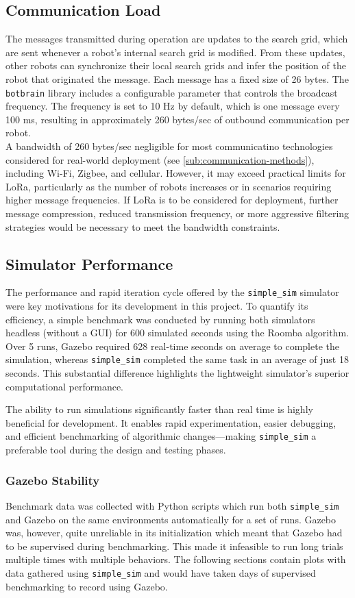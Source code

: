 \subsection{Communication Load}
The messages transmitted during operation are updates to the search grid, which are sent whenever a robot’s internal search grid is modified. From these updates, other robots can synchronize their local search grids and infer the position of the robot that originated the message. Each message has a fixed size of 26 bytes. The \texttt{botbrain} library includes a configurable parameter that controls the broadcast frequency. The frequency is set to 10 Hz by default, which is one message every 100 ms, resulting in approximately 260 bytes/sec of outbound communication per robot. \\

A bandwidth of 260 bytes/sec negligible for most communicatino technologies considered for real-world deployment (see \cref{sub:communication-methods}), including Wi-Fi, Zigbee, and cellular. However, it may exceed practical limits for LoRa, particularly as the number of robots increases or in scenarios requiring higher message frequencies. If LoRa is to be considered for deployment, further message compression, reduced transmission frequency, or more aggressive filtering strategies would be necessary to meet the bandwidth constraints.

\subsection{Simulator Performance}
\label{sec:simulator-performance}
The performance and rapid iteration cycle offered by the \texttt{simple\_sim} simulator were key motivations for its development in this project. To quantify its efficiency, a simple benchmark was conducted by running both simulators headless (without a GUI) for 600 simulated seconds using the Roomba algorithm. Over 5 runs, Gazebo required 628 real-time seconds on average to complete the simulation, whereas \texttt{simple\_sim} completed the same task in an average of just 18 seconds. This substantial difference highlights the lightweight simulator’s superior computational performance.

The ability to run simulations significantly faster than real time is highly beneficial for development. It enables rapid experimentation, easier debugging, and efficient benchmarking of algorithmic changes—making \texttt{simple\_sim} a preferable tool during the design and testing phases.

\subsubsection{Gazebo Stability}
Benchmark data was collected with Python scripts which run both \texttt{simple\_sim} and Gazebo on the same environments automatically for a set of runs. Gazebo was, however, quite unreliable in its initialization which meant that Gazebo had to be supervised during benchmarking. This made it infeasible to run long trials multiple times with multiple behaviors. The following sections contain plots with data gathered using \texttt{simple\_sim} and would have taken days of supervised benchmarking to record using Gazebo.

